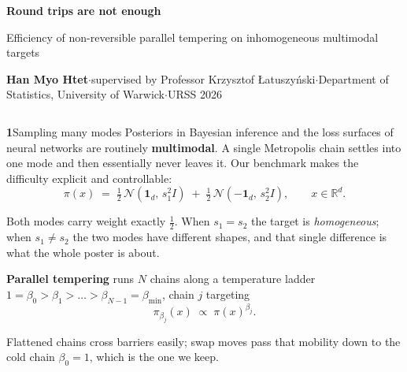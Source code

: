 \documentclass[final]{beamer}
\newcommand{\sechead}[2]{{\color{deepblue}\bfseries #1}\hspace{0.45em}#2}
\newlength{\colw}
\begin{document}
\begin{frame}[t]

\vspace{2mm}
{\fontsize{72}{80}\selectfont\bfseries Round trips are not enough\par}
\vspace{5mm}
{\fontsize{31}{36}\selectfont\color{deepblue}
 Efficiency of non-reversible parallel tempering on inhomogeneous
 multimodal targets\par}
\vspace{4mm}
{\fontsize{22}{26}\selectfont
 \textbf{Han Myo Htet}\;\;\textcolor{muted}{$\cdot$\;\;supervised by}\;
 Professor Krzysztof {\L}atuszy\'nski\;\;\textcolor{muted}{$\cdot$\;\;Department
 of Statistics, University of Warwick\;\;$\cdot$\;\;URSS 2026}\par}
\vspace{7mm}

\begin{columns}[t,totalwidth=\textwidth]

\begin{column}{\colw}

\begin{block}{\sechead{1}{Sampling many modes}}
Posteriors in Bayesian inference and the loss surfaces of neural networks are
routinely \textbf{multimodal}. A single Metropolis chain settles into one mode
and then essentially never leaves it. Our benchmark makes the difficulty
explicit and controllable:
\vspace{-1.0ex}
\[
  \pi(x)\;=\;\tfrac12\,\mathcal N\!\left(\mathbf 1_d,\,s_1^2 I\right)
        \;+\;\tfrac12\,\mathcal N\!\left(-\mathbf 1_d,\,s_2^2 I\right),
  \qquad x\in\mathbb R^{d}.
\]
\vspace{-2.6ex}

Both modes carry weight exactly $\tfrac12$. When $s_1=s_2$ the target is
\emph{homogeneous}; when $s_1\neq s_2$ the two modes have different shapes, and
that single difference is what the whole poster is about.

\textbf{Parallel tempering} runs $N$ chains along a temperature ladder
$1=\beta_0>\beta_1>\dots>\beta_{N-1}=\beta_{\min}$, chain $j$ targeting
\vspace{-1.0ex}
\[
  \pi_{\beta_j}(x)\;\propto\;\pi(x)^{\beta_j}.
\]
\vspace{-2.6ex}

Flattened chains cross barriers easily; swap moves pass that mobility down to
the cold chain $\beta_0=1$, which is the one we keep.
\end{block}


\end{column}
\end{columns}
\end{frame}
\end{document}
